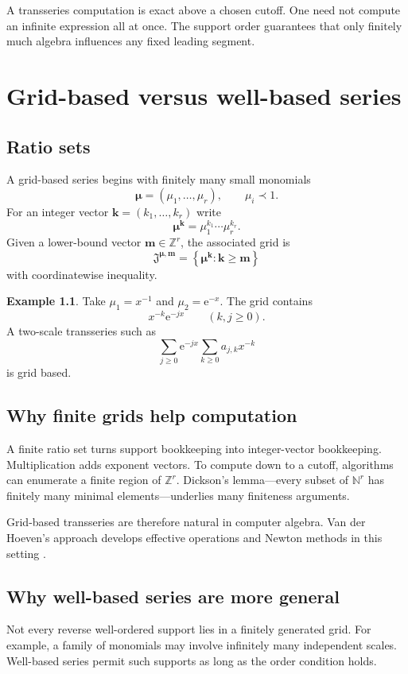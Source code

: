 \documentclass[11pt,openany]{book}
\theoremstyle{plain}
\theoremstyle{definition}
\newtheorem{example}[theorem]{Example}
\theoremstyle{remark}
\newcommand{\Z}{\mathbb{Z}}
\newcommand{\N}{\mathbb{N}}
\newcommand{\e}{\mathrm{e}}
\newcommand{\set}[1]{\left\{#1\right\}}
\begin{document}
\begin{ideabox}
A transseries computation is exact above a chosen cutoff. One need not compute an infinite expression all at once. The support order guarantees that only finitely much algebra influences any fixed leading segment.
\end{ideabox}

\chapter{Grid-based versus well-based series}
\label{chap:grids}

\section{Ratio sets}
A grid-based series begins with finitely many small monomials
\[
  \boldsymbol\mu=(\mu_1,\ldots,\mu_r),
  \qquad \mu_i\prec1.
\]
For an integer vector $\mathbf{k}=(k_1,\ldots,k_r)$ write
\[
  \boldsymbol\mu^{\mathbf{k}}
  =\mu_1^{k_1}\cdots\mu_r^{k_r}.
\]
Given a lower-bound vector $\mathbf{m}\in\Z^r$, the associated grid is
\[
  \mathfrak{J}^{\boldsymbol\mu,\mathbf{m}}
  =\set{\boldsymbol\mu^{\mathbf{k}}:\mathbf{k}\ge\mathbf{m}}
\]
with coordinatewise inequality.

\begin{example}
Take $\mu_1=x^{-1}$ and $\mu_2=\e^{-x}$. The grid contains
\[
  x^{-k}\e^{-jx}
  \qquad(k,j\ge0).
\]
A two-scale transseries such as
\[
  \sum_{j\ge0}\e^{-jx}\sum_{k\ge0}a_{j,k}x^{-k}
\]
is grid based.
\end{example}

\section{Why finite grids help computation}
A finite ratio set turns support bookkeeping into integer-vector bookkeeping. Multiplication adds exponent vectors. To compute down to a cutoff, algorithms can enumerate a finite region of $\Z^r$. Dickson's lemma---every subset of $\N^r$ has finitely many minimal elements---underlies many finiteness arguments.

Grid-based transseries are therefore natural in computer algebra. Van der Hoeven's approach develops effective operations and Newton methods in this setting \cite{Hoeven2006}.

\section{Why well-based series are more general}
Not every reverse well-ordered support lies in a finitely generated grid. For example, a family of monomials may involve infinitely many independent scales. Well-based series permit such supports as long as the order condition holds.
\end{document}
